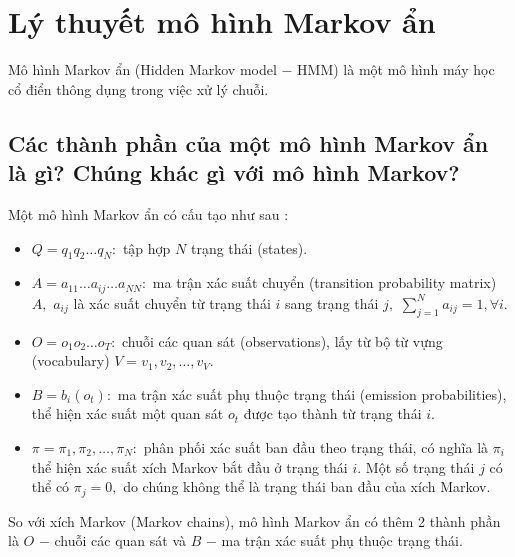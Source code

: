 \section{Lý thuyết mô hình Markov ẩn}
Mô hình Markov ẩn (Hidden Markov model $-$ HMM) là một mô hình máy học cổ điển thông dụng trong việc xử lý chuỗi.
\subsection{Các thành phần của một mô hình Markov ẩn là gì? Chúng khác gì với mô hình Markov?}
Một mô hình Markov ẩn có cấu tạo như sau \supercite{angrybird, hmm2021}:
\begin{mybox}
\begin{itemize}
\item $Q = {q_1}{q_2} \ldots {q_N}:$ tập hợp $N$ trạng thái (states).
\item $A = {a_{11}} \ldots {a_{ij}} \ldots {a_{NN}}:$ ma trận xác suất chuyển (transition probability matrix) $A,$ $a_{ij}$ là xác suất chuyển từ trạng thái $i$ sang trạng thái $j,$ $\sum\limits_{j = 1}^N {{a_{ij}}}  = 1,\forall i.$
\item $O = {o_1}{o_2} \ldots {o_T}:$ chuỗi các quan sát (observations), lấy từ bộ từ vựng (vocabulary) $V = {v_1}, {v_2}, \ldots, {v_V}.$
\item $B = b_i \left( {o_t} \right):$ ma trận xác suất phụ thuộc trạng thái (emission probabilities), thể hiện xác suất một quan sát $o_t$ được tạo thành từ trạng thái $i.$
\item $\pi = {\pi_1}, {\pi_2}, \ldots, {\pi_N}:$ phân phối xác suất ban đầu theo trạng thái, có nghĩa là $\pi_i$ thể hiện xác suất xích Markov bắt đầu ở trạng thái $i.$ Một số trạng thái $j$ có thể có $\pi_j = 0,$ do chúng không thể là trạng thái ban đầu của xích Markov.
\end{itemize}
\end{mybox}
So với xích Markov (Markov chains), mô hình Markov ẩn có thêm 2 thành phần là $O$ $-$ chuỗi các quan sát và $B$ $-$ ma trận xác suất phụ thuộc trạng thái.


